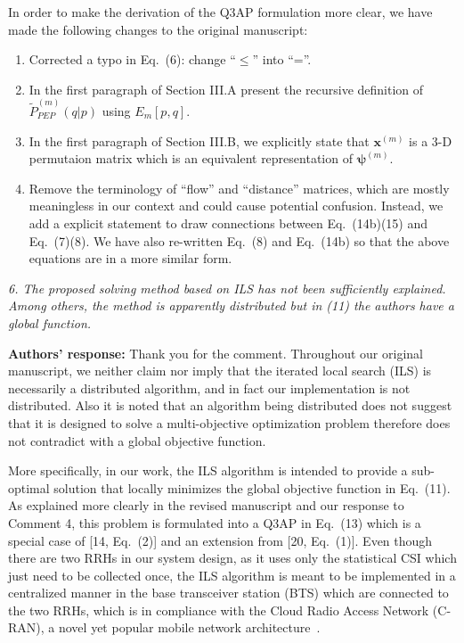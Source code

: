 \documentclass[onecolumn, 11pt, draftclsnofoot]{IEEEtran}
\begin{document}
In order to make the derivation of the Q3AP formulation more clear, we have made
the following changes to the original manuscript:
\begin{enumerate}
  \item Corrected a typo in Eq.~(6): change ``$\leq$'' into ``=''.
  \item In the first paragraph of Section III.A present the recursive definition
  of $\tilde{P}_{PEP}^{(m)}(q|p)$ using $E_m[p,q]$.
  \item In the first paragraph of Section III.B, we explicitly state that
  $\mathbf{x}^{(m)}$ is a 3-D permutaion matrix which is an equivalent
  representation of $\bm{\psi}^{(m)}$.
  \item Remove the terminology of ``flow'' and ``distance'' matrices, which are
  mostly meaningless in our context and could cause potential confusion.
  Instead, we add a explicit statement to draw connections between Eq.~(14b)(15)
  and Eq.~(7)(8). We have also re-written Eq.~(8) and Eq.~(14b) so that the
  above equations are in a more similar form.
\end{enumerate}

\vspace{0.5cm}

\noindent
\emph{6. The proposed solving method based on ILS has not been sufficiently
explained. Among others, the method is apparently distributed but in (11) the
authors have a global function.}

\noindent \textbf{Authors' response:}
Thank you for the comment. Throughout our original manuscript, we neither claim
nor imply that the iterated local search (ILS) is necessarily a distributed
algorithm, and in fact our implementation is not distributed. Also it is noted
that an algorithm being distributed does not suggest that it is
designed to solve a multi-objective optimization problem therefore does not
contradict with a global objective function.

More specifically, in our work, the ILS algorithm is intended to provide a
sub-optimal solution that locally minimizes the global objective function in
Eq.~(11). As explained more clearly in the revised manuscript and our response
to Comment 4, this problem is formulated into a Q3AP in Eq.~(13) which is a
special case of [14, Eq.~(2)] and an extension from [20, Eq.~(1)]. Even though
there are two RRHs in our system design, as it uses only the statistical CSI
which just need to be collected once, the ILS algorithm is meant to be
implemented in a centralized manner in the base transceiver station (BTS) which
are connected to the two RRHs, which is in compliance with the Cloud Radio
Access Network (C-RAN), a novel yet popular mobile network
architecture~\citep[R][]{6897914}.
\end{document}
